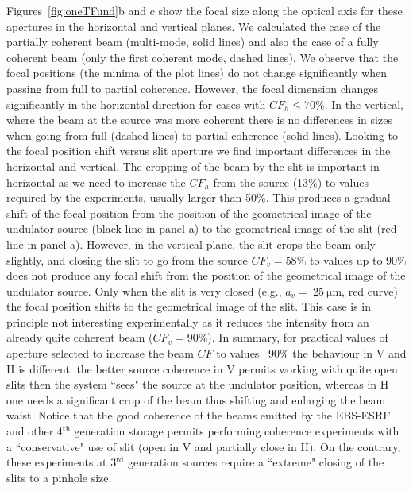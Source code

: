 \documentclass[9pt,twocolumn,twoside]{osajnl}
\begin{document}

Figures~\ref{fig:oneTFund}b and c show the focal size along the optical axis for these apertures in the horizontal and vertical planes. We calculated the case of the partially coherent beam (multi-mode, solid lines) and also the case of a fully coherent beam (only the first coherent mode, dashed lines). We observe that the focal positions (the minima of the plot lines) do not change significantly when passing from full to partial coherence. However, the focal dimension changes significantly in the horizontal direction for cases with $CF_h\le 70\%$. In the vertical, where the beam at the source was more coherent there is no differences in sizes when going from full (dashed lines) to partial coherence (solid lines). Looking to the focal position shift versus slit aperture we find important differences in the horizontal and vertical. The cropping of the beam by the slit is important in horizontal as we need to increase the $CF_h$ from the source (13\%) to values required by the experiments, usually larger than 50\%. This produces a gradual shift of the focal position from the position of the geometrical image of the undulator source (black line in panel a) to the geometrical image of the slit (red line in panel a). However, in the vertical plane, the slit crops the beam only slightly, and closing the slit to go from the source $CF_v = 58\%$ to values up to 90\% does not produce any focal shift from the position of the geometrical image of the undulator source. Only when the slit is very closed (e.g., $a_v =~\SI{25}{\micro\meter}$, red curve) the focal position shifts to the geometrical image of the slit. This case is in principle not interesting experimentally as it reduces the intensity from an already quite coherent beam ($CF_v= 90\%$).
In summary, for practical values of aperture selected to increase the beam $CF$ to values ~90\% the behaviour in V and H is different: the better source coherence in V permits working with quite open slits then the system ``sees" the source at the undulator position, whereas in H one needs a significant crop of the beam thus shifting and enlarging the beam waist. Notice that the good coherence of the beams emitted by the EBS-ESRF and other 4$^{\text{th}}$ generation storage permits performing coherence experiments with a ``conservative" use of slit (open in V and partially close in H). On the contrary, these experiments at 3$^{\text{rd}}$ generation sources require a ``extreme" closing of the slits to a pinhole size.      
\end{document}
